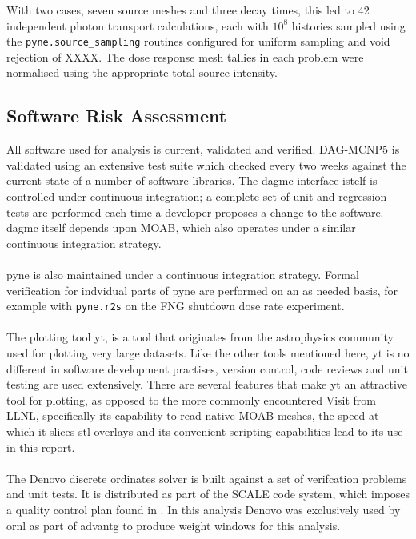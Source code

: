 \documentclass[12pt]{article}
\begin{document}

With two cases, seven source meshes and three decay times, this led to 42
independent photon transport calculations, each with $10^8$ histories sampled
using the \texttt{pyne.source\_sampling} routines configured for uniform
sampling and void rejection of XXXX.  The dose response mesh tallies in each
problem were normalised using the appropriate total source intensity.



\subsection{Software Risk Assessment}
All software used for analysis is current, validated and verified. DAG-MCNP5
is validated using an extensive test suite which checked every two weeks against
the current state of a number of software libraries.  The \gls{dagmc} interface
istelf is controlled under continuous integration; a complete set of unit and
regression tests are performed each time a developer proposes a change to the
software.  \gls{dagmc} itself depends upon MOAB, which also operates under a
similar continuous integration strategy.
\\
\\
\gls{pyne} is also maintained under a continuous integration strategy.  
Formal verification for indvidual parts of \gls{pyne} are performed on an as
needed basis, for example with \texttt{pyne.r2s} on the FNG shutdown dose rate
experiment. \cite{biondoFED2016}
\\
\\
The plotting tool yt, is a tool that originates from the astrophysics community used
for plotting very large datasets. Like the other tools mentioned here, yt is no different
in software development practises, version control, code reviews and unit testing are
used extensively. There are several features that make yt an attractive 
tool for plotting, as opposed to the more commonly encountered Visit from LLNL, specifically
its capability to read native MOAB meshes, the speed at which it slices stl overlays and 
its convenient scripting capabilities lead to its use in this report.
\\
\\
The Denovo discrete ordinates solver is built against a set of verifcation 
problems and unit tests. It is distributed as part of the SCALE code system, which imposes
a quality control plan found in \cite{scale_qa}. In this analysis Denovo was exclusively
used by \gls{ornl} as part of \gls{advantg} to produce weight windows for this analysis.
\end{document}
